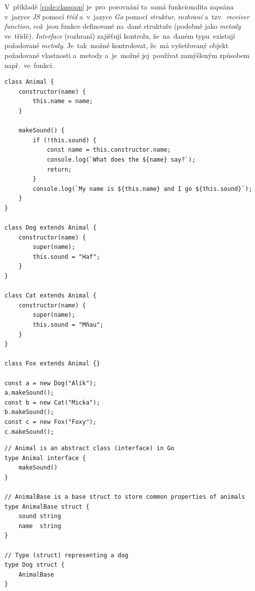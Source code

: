 \documentclass[11pt,a4paper]{report}
\let\oldacrshort\acrshort
\renewcommand{\acrshort}[1]{\emph{\normalsize\color[rgb]{0,0,0}\noindent\oldacrshort{#1}}}
\begin{document}
            V~příkladě \ref{code:classoop} je~pro~porovnání ta~samá funkcionalita zapsána v~jazyce \acrshort{JS} pomocí \emph{tříd} a~v~jazyce \emph{Go} pomocí \emph{struktur}, \emph{rozhraní} a~tzv.~\emph{receiver function}, což~jsou funkce definované na~dané struktuře (podobně jako \emph{metody} ve~třídě). \emph{Interface} (rozhraní) zajišťují kontrolu, že~na~daném typu~existují požadované \emph{metody}. Je~tak~možné kontrolovat, že~má vyšetřovaný objekt požadované vlastnosti a~metody a~je~možné jej~používat zamýšleným způsobem např.~ve~funkci.~\cite{go:OOP}

            \begin{code}
                \centering
                \begin{minipage}{.48\textwidth}
                    \begin{verbatim}
class Animal {
    constructor(name) {
        this.name = name;
    }

    makeSound() {
        if (!this.sound) {
            const name = this.constructor.name;
            console.log(`What does the ${name} say?`);
            return;
        }
        console.log(`My name is ${this.name} and I go ${this.sound}`);
    }
}

class Dog extends Animal {
    constructor(name) {
        super(name);
        this.sound = "Haf";
    }
}

class Cat extends Animal {
    constructor(name) {
        super(name);
        this.sound = "Mňau";
    }
}

class Fox extends Animal {}

const a = new Dog("Alík");
a.makeSound();
const b = new Cat("Micka");
b.makeSound();
const c = new Fox("Foxy");
c.makeSound();   
                    \end{verbatim}
                \end{minipage}
                \hfill %
                \begin{minipage}{.48\textwidth}
                    \begin{verbatim}
// Animal is an abstract class (interface) in Go
type Animal interface {
    makeSound()
}

// AnimalBase is a base struct to store common properties of animals
type AnimalBase struct {
    sound string
    name  string
}

// Type (struct) representing a dog
type Dog struct {
    AnimalBase
}


\end{verbatim}
\end{minipage}
\end{code}
\end{document}
